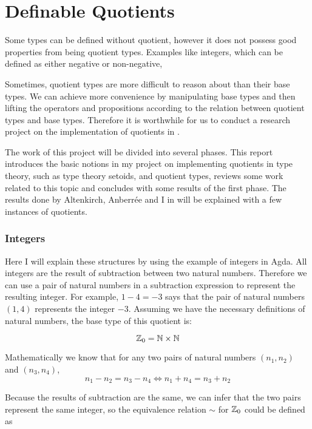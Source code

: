\chapter{Definable Quotients}


Some types can be defined without quotient, however it does not
possess good properties from being quotient types. Examples like
integers, which can be defined as either negative or non-negative,


Sometimes, quotient types are more difficult to reason about than
their base types. 
We can achieve more convenience by manipulating base types and then lifting the operators and propositions according to the relation between quotient types and base types.
Therefore it is worthwhile for us to conduct a research project on the
implementation of quotients in \itt.


The work of this project will be divided into several phases. This
report introduces the basic notions in my project on implementing
quotients in type theory, such as type theory setoids, and quotient
types, reviews some work related to this topic and concludes with some
results of the first phase. 
The results done by Altenkirch, Anberr\'{e}e and I in \cite{aan} will be explained with a
few instances of quotients.


\subsection{Integers}

Here I will explain these structures by using the example of integers
in Agda. All integers are the result of subtraction between two
natural numbers. Therefore we can use a pair of natural numbers in a subtraction
expression to represent the resulting integer.
For example, $1 - 4 = - 3$ says that the pair of natural numbers $(1,4)$
represents the integer $- 3$. Assuming we have the necessary definitions
of natural numbers, the base type of this quotient is:

$$\mathbb{Z}_0=\mathbb{N} \times \mathbb{N}$$

Mathematically we know that for any two pairs of natural numbers $(n_1, n_2)$ and $(n_3, n_4)$, 
$$ n_1 - n_2 = n_3 - n_4\iff n_1 + n_4 = n_3 + n_2$$

Because the results of subtraction are the same, we can infer that the
two pairs represent the same integer, so the equivalence relation
$\sim$ for $\mathbb{Z}_0$ could be defined as

